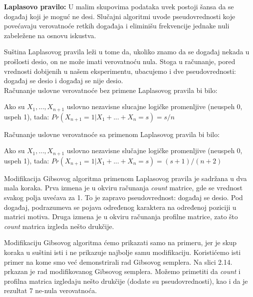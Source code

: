 \begin{tcolorbox}
\textbf{Laplasovo pravilo:} U malim skupovima podataka uvek postoji šansa da se događaj koji je moguć ne desi. Slučajni algoritmi uvode pseudovrednosti koje povećavaju verovatnoće retkih događaja i eliminišu frekvencije jednake nuli zabeležene na osnovu iskustva.
\end{tcolorbox}

\indent Suština Laplasovog pravila leži u tome da, ukoliko znamo da se događaj nekada u prošlosti desio, on ne može imati verovatnoću nula. Stoga u računanje, pored vrednosti dobijenih u našem eksperimentu, ubacujemo i dve pseudovrednosti: događaj se desio i događaj se nije desio. \\

\noindent Računanje uslovne verovatnoće bez primene Laplasovog pravila bi bilo:
\begin{tcolorbox}
Ako su $X_1, ..., X_{n+1}$ uslovno nezavisne slucajne logičke promenljive (neuspeh 0, uspeh 1), tada: $Pr(X_{n+1}=1|X_1+...+X_n=s)=s/n$
\end{tcolorbox}

\noindent Računanje uslovne verovatnoće sa primenom Laplasovog pravila bi bilo:
\begin{tcolorbox}
Ako su $X_1, ..., X_{n+1}$ uslovno nezavisne slučajne logičke promenljive (neuspeh 0, uspeh 1), tada: $Pr(X_{n+1}=1|X_1+...+X_n=s)=(s+1)/(n+2)$
\end{tcolorbox}

Modifikacija Gibsovog algoritma primenom Laplasovog pravila je sadržana u dva mala koraka. Prva izmena je u okviru računanja \textit{count} matrice, gde se vrednost svakog polja uvećava za 1. To je zapravo pseudovrednost: događaj se desio. Pod događaj, podrazumeva se pojava određenog karaktera na određenoj poziciji u matrici motiva. Druga izmena je u okviru računanja profilne matrice, zato što \textit{count} matrica izgleda nešto drukčije. 

Modifikaciju Gibsovog algoritma ćemo prikazati samo na primeru, jer je skup koraka u suštini isti i ne prikazuje najbolje samu modifikaciju. Koristićemo isti primer na kome smo već demonstrirali rad Gibsovog semplera. Na slici 2.14. prkazan je rad modifikovanog Gibsovog semplera. Možemo primetiti da \textit{count} i profilna matrica izgledaju nešto drukčije (dodate su pseudovrednosti), kao i da je rezultat 7 ne-nula verovatnoća.


